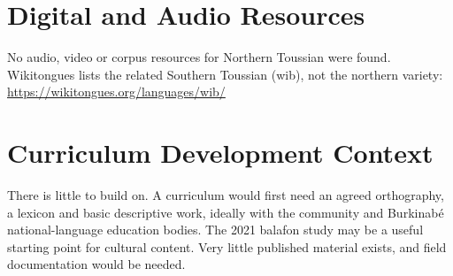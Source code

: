 \documentclass[12pt]{article}
\begin{document}
\section{Digital and Audio Resources}
No audio, video or corpus resources for Northern Toussian were found. Wikitongues lists the related Southern Toussian (wib), not the northern variety: \url{https://wikitongues.org/languages/wib/}

\section{Curriculum Development Context}
There is little to build on. A curriculum would first need an agreed orthography, a lexicon and basic descriptive work, ideally with the community and Burkinab\'e national-language education bodies. The 2021 balafon study may be a useful starting point for cultural content. Very little published material exists, and field documentation would be needed.
\end{document}
